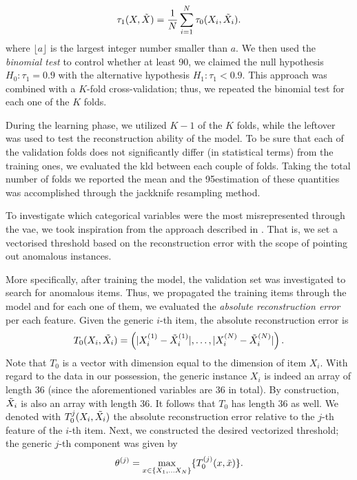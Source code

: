 \begin{equation}
    \tau_1(X, \Tilde{X}) = \frac{1}{N}\sum_{i = 1}^{N} \tau_0(X_{i}, \Tilde{X}_{i}).
\end{equation}
where $\lfloor{a}\rfloor$ is the largest integer number smaller than $a$. 
We then used the \emph{binomial test} to control whether at least 90\Thus, we claimed the null hypothesis $H_0 : \tau_1 = 0.9$ with the alternative hypothesis $H_1 : \tau_1 < 0.9$.
This approach was combined with a $K$-fold cross-validation; thus, we repeated the binomial test for each one of the $K$ folds.

During the learning phase, we utilized $K-1$ of the $K$ folds, while the leftover was used to test the reconstruction ability of the model.
To be sure that each of the validation folds does not significantly differ (in statistical terms) from the training ones, we evaluated the \gls{kld} between each couple of folds.
Taking the total number of folds we reported
the mean and the 95\The estimation of these quantities was accomplished through the jackknife resampling method.

To investigate which categorical variables were the most misrepresented through the \gls{vae}, we took inspiration from the approach described in \cite{torabi2023practical}.
That is, we set a vectorised threshold based on the reconstruction error with the scope of pointing out anomalous instances.

More specifically, after training the model, the validation set was investigated to search for anomalous items.
Thus, we propagated the training items through the model and for each one of them, we evaluated the \emph{absolute reconstruction error} per each feature.
Given the generic $i$-th item, the absolute reconstruction error is 
\begin{equation}
    T_0(X_i, \Tilde{X_i}) = \left(|X^{(1)}_{i}-\Tilde{X}^{(1)}_{i}|,\dots, |X^{(N)}_{i}-\Tilde{X}^{(N)}_{i}| \right).
\end{equation}
Note that $T_0$ is a vector with dimension equal to the dimension of item $X_{i}$.
With regard to the data in our possession, the generic instance $X_i$ is indeed an array of length 36 (since the aforementioned variables are 36 in total).
By construction, $\Tilde{X}_i$ is also an array with length 36. 
It follows that $T_0$ has length 36 as well. 
We denoted with $T_0^{j}(X_i, \Tilde{X_i})$ the absolute reconstruction error relative to the $j$-th feature of the $i$-th item.
Next, we constructed the desired vectorized threshold; the generic $j$-th component was given by
\begin{equation}
    \theta^{(j)} = \max_{x \in \{X_1, \dots X_{N}\}} \{T_0^{(j)}(x, \Tilde{x})\}.
\end{equation}

